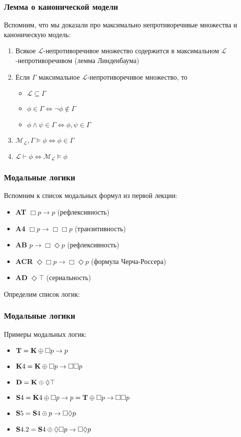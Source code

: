 \documentclass[pdf,utf8,russian,aspectratio=169]{beamer}
\begin{document}
\begin{frame}
  \frametitle{Лемма о канонической модели}
  Вспомним, что мы доказали про максимально непротиворечивые множества и каноническую модель:
\begin{enumerate}
  \item Всякое $\mathcal{L}$-непротиворечивое множество содержится в максимальном $\mathcal{L}$-непротиворечивом (лемма Линденбаума)
  \item Если $\Gamma$ максимальное $\mathcal{L}$-непротиворечивое множество, то
  \begin{itemize}
    \item $\mathcal{L} \subseteq \Gamma$
    \item $\phi \in \Gamma \Leftrightarrow \neg \phi \notin \Gamma$
    \item $\phi \land \psi \in \Gamma \Leftrightarrow \phi, \psi \in \Gamma$
  \end{itemize}
  \item $\mathcal{M}_{\mathcal{L}}, \Gamma \models \phi \Leftrightarrow \phi \in \Gamma$
  \item $\mathcal{L} \vdash \phi \Leftrightarrow \mathcal{M}_{\mathcal{L}} \models \phi$
\end{enumerate}
\end{frame}

\begin{frame}
  \frametitle{Модальные логики}

  Вспомним к список модальных формул из первой лекции:

  \begin{itemize}
    \item {\bf AT} $\Box p \to p$ (рефлексивность)
    \item {\bf A4} $\Box p \to \Box \Box p$ (транзитивность)
    \item {\bf AB} $p \to \Box \Diamond p$ (рефлексивность)
    \item {\bf ACR} $\Diamond \Box p \to \Box \Diamond p$ (формула Черча-Россера)
    \item {\bf AD} $\Diamond \top$ (сериальность)
  \end{itemize}

  Определим список логик:
\end{frame}

\begin{frame}
  \frametitle{Модальные логики}

  Примеры модальных логик:

\begin{itemize}
  \item ${\bf T} = {\bf K} \oplus \Box p \to p$
  \item ${\bf K}4 = {\bf K} \oplus \Box p \to \Box \Box p$
  \item ${\bf D} = {\bf K} \oplus \Diamond \top$
  \item ${\bf S}4 = {\bf K}4 \oplus \Box p \to p = {\bf T} \oplus \Box p \to \Box \Box p$
  \item ${\bf S}5 = {\bf S}4 \oplus p \to \Box \Diamond p$
  \item ${\bf S}4.2 = {\bf S}4 \oplus \Diamond \Box p \to \Box \Diamond p$
\end{itemize}
\end{frame}
\end{document}
